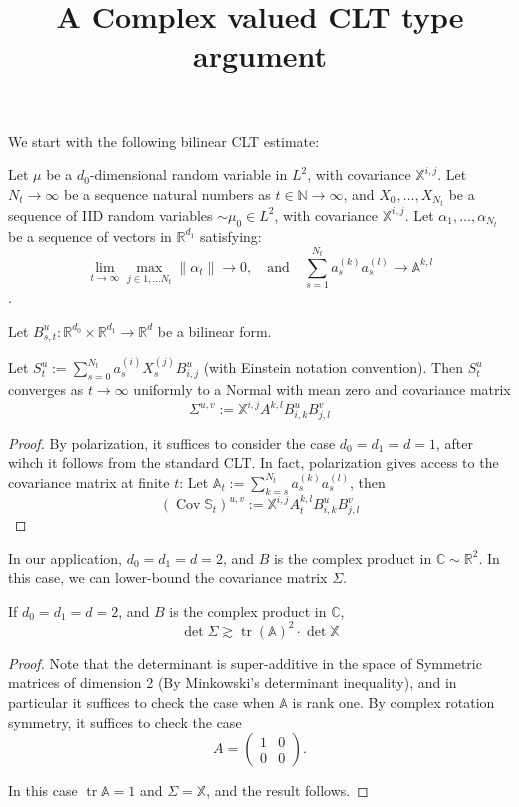 \documentclass{inprogress}
\title{A Complex valued CLT type argument}
\newcommand{\tr}{\operatorname{tr}}
\begin{document}
\maketitle

We start with the following bilinear CLT estimate:

\begin{lemma}
    Let $\mu$ be a  $d_0$-dimensional random variable in $L^2$, with covariance $\mathbb X^{i,j}$.
    Let $N_t \to \infty $ be a sequence natural numbers as $t\in \mathbb N \to \infty$, and $X_0, \dots, X_{N_t}$ be a sequence of IID random variables $\sim \mu_0 \in L^2$, with covariance $\mathbb X^{i,j}$.
    Let $\alpha_{1}, \dots, \alpha_{N_t}$ be a sequence of vectors in $\mathbb R^{d_1}$ satisfying:
    \[\lim_{t\to \infty}\max_{j \in 1, \dots N_t} \|\alpha_t\| \to 0, \quad\text{and} \quad \sum_{s=1}^{N_t} a_s^{(k)}a_s^{(l)} \to \mathbb A^{k,l}\].

    Let $B_{s,t}^u:\mathbb R^{d_0}\times \mathbb R^{d_1} \to \mathbb R^{d}$ be a bilinear form. 

    Let $S_t^u:= \sum_{s=0}^{N_t} a^{(i)}_{s}X^{(j)}_{s} B_{i,j}^u $ (with Einstein notation convention). Then $S_t^{u}$ converges as $t\to \infty$ uniformly to a Normal with mean zero and covariance matrix
    \[
    \Sigma^{u,v} :=   \mathbb X^{i,j} A^{k,l} B_{i,k}^u B_{j,l}^v 
    \]
\end{lemma}

\begin{proof}
    By polarization, it suffices to consider the case $d_0 = d_1 = d = 1$, after wihch it follows from the standard CLT. In fact, polarization gives access to the covariance matrix at finite $t$: Let $\mathbb A_t := \sum_{k=s}^{N_t} a_s^{(k)}a_s^{(l)}$, then 
    \[
    (\operatorname{Cov}\mathbb S_t)^{u,v} :=  \mathbb X^{i,j} A^{k,l}_t B_{i,k}^u B_{j,l}^v \]
\end{proof}

In our application, $d_0 = d_1 = d = 2$, and $B$ is the complex product in $\mathbb C \sim \mathbb R^2$. In this case, we can lower-bound the covariance matrix $\Sigma$.


\begin{lemma} If $d_0=d_1=d = 2$, and $B$ is the complex product in $\mathbb C$,
\[
\det \Sigma \gtrsim \tr(\mathbb A)^2 \cdot \det \mathbb X
\]
\end{lemma}

\begin{proof}
    Note that the determinant is super-additive in the space of Symmetric matrices of dimension 2 (By Minkowski's determinant inequality), and in particular it suffices to check the case when $\mathbb A$ is rank one. By complex rotation symmetry, it suffices to check the case 
    \[
    A = \begin{pmatrix}
        1 & 0 \\ 0 & 0
    \end{pmatrix}.
    \]

    In this case $\tr \mathbb A = 1$ and $\Sigma = \mathbb X$, and the result follows. 
\end{proof}
\end{document}
